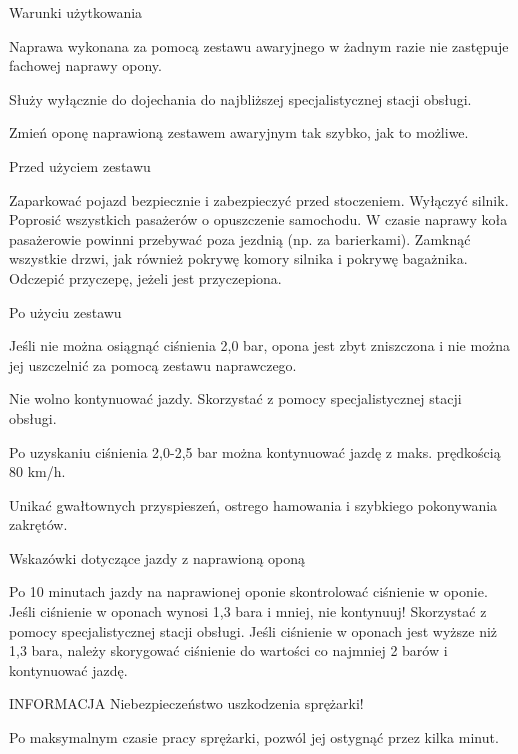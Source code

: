 Warunki użytkowania

Naprawa wykonana za pomocą zestawu awaryjnego w żadnym razie nie zastępuje fachowej naprawy opony.

Służy wyłącznie do dojechania do najbliższej specjalistycznej stacji obsługi.

Zmień oponę naprawioną zestawem awaryjnym tak szybko, jak to możliwe.

Przed użyciem zestawu
\begin{itemizeArrow}
	\itemArrow Zaparkować pojazd bezpiecznie i zabezpieczyć przed stoczeniem.
	\itemArrow Wyłączyć silnik.
	\itemArrow Poprosić wszystkich pasażerów o opuszczenie samochodu. W czasie naprawy koła pasażerowie powinni przebywać poza jezdnią (np. za barierkami).
	\itemArrow Zamknąć wszystkie drzwi, jak również pokrywę komory silnika i pokrywę bagażnika.
	\itemArrow Odczepić przyczepę, jeżeli jest przyczepiona.
\end{itemizeArrow}

Po użyciu zestawu

Jeśli nie można osiągnąć ciśnienia 2,0 bar, opona jest zbyt zniszczona i nie można jej uszczelnić za pomocą zestawu naprawczego.
\begin{itemizeArrow}
	\itemArrow Nie wolno kontynuować jazdy. Skorzystać z pomocy specjalistycznej stacji obsługi.
\end{itemizeArrow}
Po uzyskaniu ciśnienia 2,0-2,5 bar można kontynuować jazdę z maks. prędkością 80 km/h.
\begin{itemizeArrow}
	\itemArrow Unikać gwałtownych przyspieszeń, ostrego hamowania i szybkiego pokonywania zakrętów.
\end{itemizeArrow}

Wskazówki dotyczące jazdy z naprawioną oponą
\begin{itemizeArrow}
	\itemArrow Po 10 minutach jazdy na naprawionej oponie skontrolować ciśnienie w oponie.
	\itemArrow Jeśli ciśnienie w oponach wynosi 1,3 bara i mniej, nie kontynuuj! Skorzystać z pomocy specjalistycznej stacji obsługi.
	\itemArrow Jeśli ciśnienie w oponach jest wyższe niż 1,3 bara, należy skorygować ciśnienie do wartości co najmniej 2 barów i kontynuować jazdę.
\end{itemizeArrow}

INFORMACJA
Niebezpieczeństwo uszkodzenia sprężarki!
\begin{itemizeTriangle}
	\itemTriangle Po maksymalnym czasie pracy sprężarki, pozwól jej ostygnąć przez kilka minut.
\end{itemizeTriangle}

